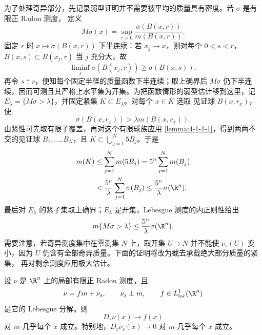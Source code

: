 为了处理奇异部分，先记录弱型证明并不需要被平均的质量具有密度。若 $\sigma$ 是有限正 Radon 测度，
定义
\[
 M\sigma(x)=\sup_{r>0}\frac{\sigma(B(x,r))}{m(B(x,r))}.
\]
固定 $r$ 时 $x\mapsto\sigma(B(x,r))$ 下半连续：若 $x_j\to x$，则对每个 $0<s<r$，
$B(x,s)\subset B(x_j,r)$ 当 $j$ 充分大，故
\[
 \liminf_j\sigma(B(x_j,r))\ge\sigma(B(x,s));
\]
再令 $s\uparrow r$，便知每个固定半径的质量函数下半连续；取上确界后
$M\sigma$ 仍下半连续，因而可测且其严格上水平集为开集。为把函数情形的弱型估计移到这里，记
$E_\lambda=\{M\sigma>\lambda\}$，并固定紧集 $K\subset E_\lambda$。对每个 $x\in K$ 选取
见证球 $B(x,r_x)$，使
\[
  \sigma(B(x,r_x))>\lambda m(B(x,r_x)).
\]
由紧性可先取有限子覆盖，再对这个有限球族应用
\cref{lemma:4-1-1-1}，得到两两不交的见证球
$B_1,\ldots,B_N$，且 $K\subset\bigcup_{j=1}^N5B_j$。于是
\[
 \begin{aligned}
 m(K)&\le\sum_{j=1}^Nm(5B_j)
      =5^n\sum_{j=1}^Nm(B_j)\\
 &<\frac{5^n}{\lambda}\sum_{j=1}^N\sigma(B_j)
 \le\frac{5^n}{\lambda}\sigma(\R^n).
 \end{aligned}
\]
最后对 $E_\lambda$ 的紧子集取上确界；$E_\lambda$ 是开集，Lebesgue 测度的内正则性给出
\begin{equation}\label{eq:4-1-measure-maximal}
 m\{M\sigma>\lambda\}\le\frac{5^n}{\lambda}\sigma(\R^n).
\end{equation}
需要注意，若奇异测度集中在零测集 $N$ 上，取开集 $U\supset N$ 并不能使
$\nu_s(U)$ 变小，因为 $U$ 仍含有全部奇异质量。下面的证明将改为截去承载绝大部分质量的紧集，
再对剩余测度应用极大估计。

\begin{theorem}\label{theorem:4-1-3-2}
设 $\nu$ 是 $\R^n$ 上的局部有限正 Radon 测度，且
\[
 \nu=fm+\nu_s,\qquad \nu_s\perp m,\qquad f\in L^1_{\mathrm{loc}}(\R^n)
\]
是它的 Lebesgue 分解。则
\[
 D_r\nu(x)\longrightarrow f(x)
\]
对 $m$-几乎每个 $x$ 成立。特别地，$D_r\nu_s(x)\to0$ 对 $m$-几乎每个 $x$ 成立。
\end{theorem}

